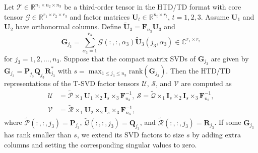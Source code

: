 \documentclass[onefignum,onetabnum]{siamart250211}
\begin{document}
\begin{proposition} 
\label{prop:htd_tsvd}
Let $\mathscr{T}\in\mathbb{R}^{n_1\times n_2\times n_3}$ be a third-order
tensor in the HTD/TD format with core tensor
    $\mathscr{G}\in\mathbb{R}^{r_1\times r_2\times r_3}$ and factor matrices $\textbf{U}_t\in\mathbb{R}^{n_t\times r_t}$, $t= 1,2,3$. Assume $\textbf{U}_1$ and $\textbf{U}_2$ have orthonormal columns. Define $\widetilde{\textbf{U}}_3
=
\textbf{F}_{n_3}\textbf{U}_3$ and 
\begin{equation*}
    \textbf{G}_{j_3}
=
\sum_{\alpha_3=1}^{r_3}
\mathscr{G}(:,:, \alpha_3)
\widetilde{\textbf{U}}_3(j_3,\alpha_3)
\in \mathbb{C}^{r_1\times r_2}
\end{equation*}
for $j_3=1,2,\dots,n_3$. Suppose that the compact matrix SVDs of $\textbf{G}_{j_3}$ are given by $\textbf{G}_{j_3}=\textbf{P}_{j_3}\textbf{Q}_{j_3}\textbf{R}_{j_3}^{*}$ with $s=\max_{1\leq j_3\leq n_3}\text{rank}(\textbf{G}_{j_3})$. Then the HTD/TD representations of the T-SVD factor tensors $\mathscr{U}$, $\mathscr{S}$, and $\mathscr{V}$ are computed as
\begin{align*}
    \mathscr{U} &= \widetilde{\mathscr{P}}\times_1\textbf{U}_1\times_2\textbf{I}_{s}\times_3\textbf{F}_{n_3}^{-1}, \ \mathscr{S} = \widetilde{\mathscr{Q}}\times_1\textbf{I}_s\times_2\textbf{I}_s\times_3\textbf{F}_{n_3}^{-1},\\ 
    \mathscr{V} &= \widetilde{\mathscr{R}}\times_1\textbf{U}_2\times_2\textbf{I}_s\times_3\textbf{F}_{n_3}^{-1},
\end{align*}
where $\widetilde{\mathscr{P}}(:,:,j_3)=\textbf{P}_{j_3}$, $\widetilde{\mathscr{Q}}(:,:,j_3)=\textbf{Q}_{j_3}$, and $\widetilde{\mathscr{R}}(:,:,j_3)=\textbf{R}_{j_3}$. If some $\textbf{G}_{j_3}$ has rank smaller than $s$, we extend its SVD
factors to size $s$ by adding extra columns and setting the corresponding
singular values to zero.
\end{proposition}
\end{document}
